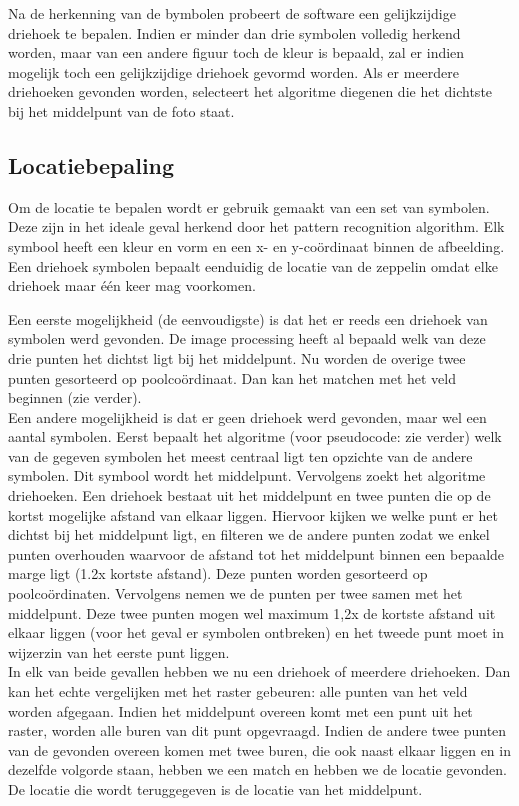 \documentclass[eind]{penoverslag}
\begin{document}
Na de herkenning van de bymbolen probeert de software een gelijkzijdige driehoek te bepalen. Indien er minder dan drie symbolen volledig herkend worden, maar van een andere figuur toch de kleur is bepaald, zal er indien mogelijk toch een gelijkzijdige driehoek gevormd worden. Als er meerdere driehoeken gevonden worden, selecteert het algoritme diegenen die het dichtste bij het middelpunt van de foto staat.\\


\subsection{Locatiebepaling}
Om de locatie te bepalen wordt er gebruik gemaakt van een set van symbolen. Deze zijn in het ideale geval herkend door het pattern recognition algorithm. Elk symbool heeft een kleur en vorm en een x- en y-coördinaat binnen de afbeelding. Een driehoek symbolen bepaalt eenduidig de locatie van de zeppelin omdat elke driehoek maar \'e\'en keer mag voorkomen.

Een eerste mogelijkheid (de eenvoudigste) is dat het er reeds een driehoek van symbolen werd gevonden. De image processing heeft al bepaald welk van deze drie punten het dichtst ligt bij het middelpunt. Nu worden de overige twee punten gesorteerd op poolco\"ordinaat. Dan kan het matchen met het veld beginnen (zie verder). \\

Een andere mogelijkheid is dat er geen driehoek werd gevonden, maar wel een aantal symbolen. Eerst bepaalt het algoritme (voor pseudocode: zie verder) welk van de gegeven symbolen het meest centraal ligt ten opzichte van de andere symbolen. Dit symbool wordt het middelpunt. Vervolgens zoekt het algoritme driehoeken. Een driehoek bestaat uit het middelpunt en twee punten die op de kortst mogelijke afstand van elkaar liggen. Hiervoor kijken we welke punt er het dichtst bij het middelpunt ligt, en filteren we de andere punten zodat we enkel punten overhouden waarvoor de afstand tot het middelpunt binnen een bepaalde marge ligt (1.2x kortste afstand). Deze punten worden gesorteerd op poolco\"ordinaten. Vervolgens nemen we de punten per twee samen met het middelpunt. Deze twee punten mogen wel maximum 1,2x de kortste afstand uit elkaar liggen (voor het geval er symbolen ontbreken) en het tweede punt moet in wijzerzin van het eerste punt liggen. \\

In elk van beide gevallen hebben we nu een driehoek of meerdere driehoeken. Dan kan het echte vergelijken met het raster gebeuren: alle punten van het veld worden afgegaan. Indien het middelpunt overeen komt met een punt uit het raster, worden alle buren van dit punt opgevraagd. Indien de andere twee punten van de gevonden overeen komen met twee buren, die ook naast elkaar liggen en in dezelfde volgorde staan, hebben we een match en hebben we de locatie gevonden. De locatie die wordt teruggegeven is de locatie van het middelpunt.\\
\end{document}
